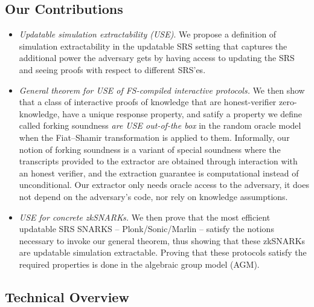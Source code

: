 \subsection{Our Contributions}
\begin{itemize}
\item 
\emph{Updatable simulation extractability (USE)}. 
We propose a definition of simulation extractability in the updatable SRS setting that captures the additional power the adversary gets by having access to updating the SRS and seeing proofs with respect to different SRS'es.
    
\item 
\emph{General theorem for USE of FS-compiled interactive protocols.}
We then show that a class of interactive proofs of knowledge that are honest-verifier zero-knowledge,
have a unique response property, and satify a property we define called forking soundness \emph{are USE out-of-the box} in the random oracle model when the Fiat--Shamir transformation is applied to them. 
Informally, our notion of forking soundness is a variant of special soundness where the transcripts provided to the extractor are
obtained through interaction with an honest verifier, and the extraction guarantee is computational instead of unconditional. 
Our extractor only needs oracle access to the adversary, it does not depend on the adversary’s code, nor rely on knowledge
assumptions.
    
\item
\emph{USE for concrete zkSNARKs.}
We then prove that the most efficient updatable SRS SNARKS -- Plonk/Sonic/Marlin -- satisfy the notions necessary to invoke our general theorem, thus showing that these zkSNARKs are updatable simulation extractable.
Proving that these protocols satisfy the required properties is done in the algebraic group model (AGM).
	
\end{itemize}



\subsection{Technical Overview}

